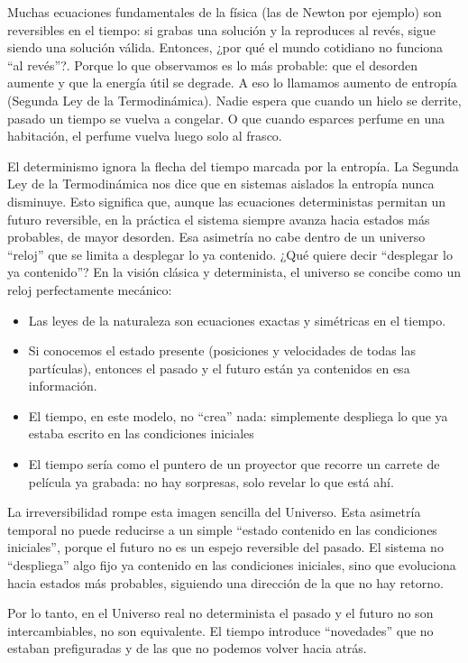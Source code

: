 \documentclass[
  11pt,
  a4paper,
  DIV=11,
  numbers=noendperiod]{scrreprt}
\providecommand{\tightlist}{%
  \setlength{\itemsep}{0pt}\setlength{\parskip}{0pt}}
\begin{document}
Muchas ecuaciones fundamentales de la física (las de Newton por ejemplo)
son reversibles en el tiempo: si grabas una solución y la reproduces al
revés, sigue siendo una solución válida. Entonces, ¿por qué el mundo
cotidiano no funciona ``al revés''?. Porque lo que observamos es lo más
probable: que el desorden aumente y que la energía útil se degrade. A
eso lo llamamos aumento de entropía (Segunda Ley de la Termodinámica).
Nadie espera que cuando un hielo se derrite, pasado un tiempo se vuelva
a congelar. O que cuando esparces perfume en una habitación, el perfume
vuelva luego solo al frasco.

El determinismo ignora la flecha del tiempo marcada por la entropía. La
Segunda Ley de la Termodinámica nos dice que en sistemas aislados la
entropía nunca disminuye. Esto significa que, aunque las ecuaciones
deterministas permitan un futuro reversible, en la práctica el sistema
siempre avanza hacia estados más probables, de mayor desorden. Esa
asimetría no cabe dentro de un universo ``reloj'' que se limita a
desplegar lo ya contenido. ¿Qué quiere decir ``desplegar lo ya
contenido''? En la visión clásica y determinista, el universo se concibe
como un reloj perfectamente mecánico:

\begin{itemize}
\tightlist
\item
  Las leyes de la naturaleza son ecuaciones exactas y simétricas en el
  tiempo.
\item
  Si conocemos el estado presente (posiciones y velocidades de todas las
  partículas), entonces el pasado y el futuro están ya contenidos en esa
  información.
\item
  El tiempo, en este modelo, no ``crea'' nada: simplemente despliega lo
  que ya estaba escrito en las condiciones iniciales
\item
  El tiempo sería como el puntero de un proyector que recorre un carrete
  de película ya grabada: no hay sorpresas, solo revelar lo que está
  ahí.
\end{itemize}

La irreversibilidad rompe esta imagen sencilla del Universo. Esta
asimetría temporal no puede reducirse a un simple ``estado contenido en
las condiciones iniciales'', porque el futuro no es un espejo reversible
del pasado. El sistema no ``despliega'' algo fijo ya contenido en las
condiciones iniciales, sino que evoluciona hacia estados más probables,
siguiendo una dirección de la que no hay retorno.

Por lo tanto, en el Universo real no determinista el pasado y el futuro
no son intercambiables, no son equivalente. El tiempo introduce
``novedades'' que no estaban prefiguradas y de las que no podemos volver
hacia atrás.
\end{document}
